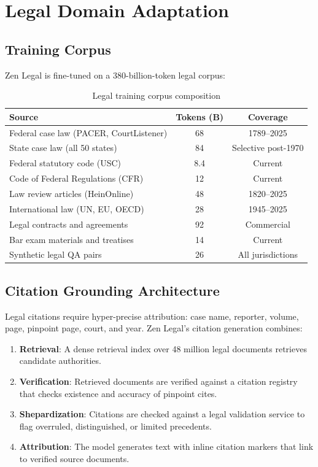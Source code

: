 \documentclass[11pt,a4paper]{article}
\begin{document}
\section{Legal Domain Adaptation}

\subsection{Training Corpus}

Zen Legal is fine-tuned on a 380-billion-token legal corpus:

\begin{table}[H]
\centering
\caption{Legal training corpus composition}
\label{tab:corpus}
\begin{tabular}{lcc}
\toprule
Source & Tokens (B) & Coverage \\
\midrule
Federal case law (PACER, CourtListener) & 68 & 1789--2025 \\
State case law (all 50 states) & 84 & Selective post-1970 \\
Federal statutory code (USC) & 8.4 & Current \\
Code of Federal Regulations (CFR) & 12 & Current \\
Law review articles (HeinOnline) & 48 & 1820--2025 \\
International law (UN, EU, OECD) & 28 & 1945--2025 \\
Legal contracts and agreements & 92 & Commercial \\
Bar exam materials and treatises & 14 & Current \\
Synthetic legal QA pairs & 26 & All jurisdictions \\
\bottomrule
\end{tabular}
\end{table}

\subsection{Citation Grounding Architecture}

Legal citations require hyper-precise attribution: case name, reporter, volume, page, pinpoint page, court, and year. Zen Legal's citation generation combines:

\begin{enumerate}
  \item \textbf{Retrieval}: A dense retrieval index over 48 million legal documents retrieves candidate authorities.
  \item \textbf{Verification}: Retrieved documents are verified against a citation registry that checks existence and accuracy of pinpoint cites.
  \item \textbf{Shepardization}: Citations are checked against a legal validation service to flag overruled, distinguished, or limited precedents.
  \item \textbf{Attribution}: The model generates text with inline citation markers that link to verified source documents.
\end{enumerate}
\end{document}
